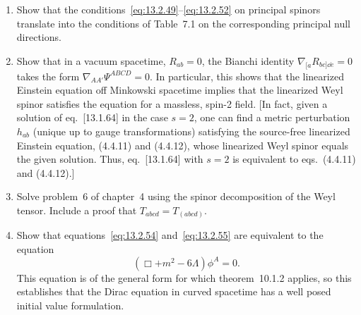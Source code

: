 \begin{enumerate}[label=\arabic*.,leftmargin=2em,itemsep=1.2ex]
\item
Show that the conditions~\eqref{eq:13.2.49}--\eqref{eq:13.2.52} on principal
spinors translate into the conditions of Table~7.1 on the corresponding principal
null directions.

\item
Show that in a vacuum spacetime, \(R_{ab}=0\), the Bianchi identity
\(\nabla_{[a}R_{bc]\dd e}=0\) takes the form
\(\nabla_{AA'}\Psi^{ABCD}=0\). In particular, this shows that the linearized
Einstein equation off Minkowski spacetime implies that the linearized Weyl spinor
satisfies the equation for a massless, spin-2 field. [In fact, given a solution of
eq.~[13.1.64] in the case \(s=2\), one can find a metric perturbation \(h_{ab}\)
(unique up to gauge transformations) satisfying the source-free linearized Einstein
equation, (4.4.11) and (4.4.12), whose linearized Weyl spinor equals the given
solution. Thus, eq.~[13.1.64] with \(s=2\) is equivalent to eqs.~(4.4.11) and
(4.4.12).]

\item
Solve problem~6 of chapter~4 using the spinor decomposition of the Weyl tensor.
Include a proof that \(T_{abcd}=T_{(abcd)}\).

\item
Show that equations~\eqref{eq:13.2.54} and~\eqref{eq:13.2.55} are equivalent to
the equation
\[
  (\Box+m^2-6\Lambda)\phi^A=0.
\]
This equation is of the general form for which theorem~10.1.2 applies, so this
establishes that the Dirac equation in curved spacetime has a well posed initial
value formulation.
\end{enumerate}

\setcounter{footnote}{\chapterthirteenpreviousfootnote}
\endgroup
